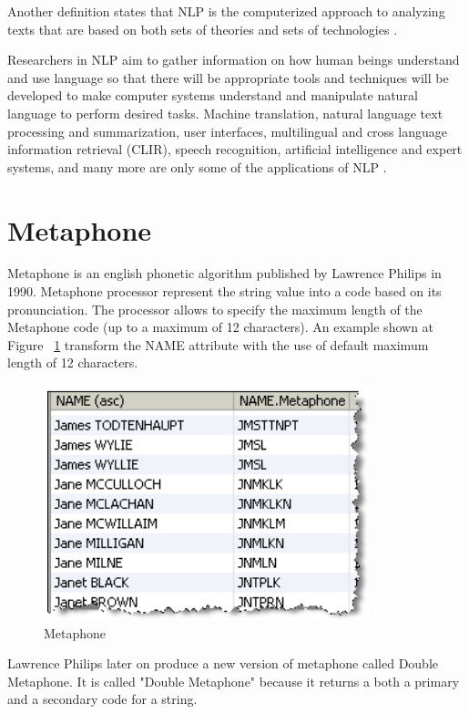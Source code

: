 \documentclass[12pt]{book}
\begin{document}
Another definition states that NLP is the computerized approach to analyzing texts that are based on both sets of theories and sets of technologies \cite{liddy2001natural}.

Researchers in NLP aim to gather information on how human beings understand and use language so that there will be appropriate tools and techniques will be developed to make computer systems understand and manipulate natural language to perform desired tasks. Machine translation, natural language text processing and summarization, user interfaces, multilingual and cross language information retrieval (CLIR), speech recognition, artificial intelligence and expert systems, and many more are only some of the applications of NLP \cite{chowdhury2003natural}.

\section{Metaphone}
Metaphone is an english phonetic algorithm published by Lawrence Philips in 1990. Metaphone processor represent the string value into a code based on its pronunciation. The processor allows to specify the maximum length of the Metaphone code (up to a maximum of 12 characters). An example shown at Figure ~\ref{metaphone} transform the NAME attribute with the use of default maximum length of 12 characters.

\begin{figure}
\begin{center}	
\includegraphics[scale=.50]{metaphone.png}
	\caption[Metaphone]
	{Metaphone}	
	\label{metaphone}
\end{center}
\end{figure}

Lawrence Philips later on produce a new version of metaphone called Double Metaphone. It is called "Double Metaphone" because it returns a both a primary and a secondary code for a string.
\end{document}
